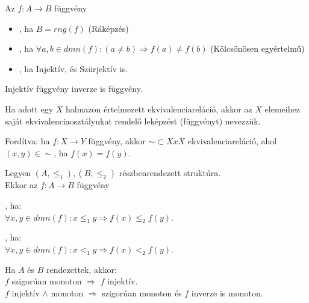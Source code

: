 \begin{frame}
\begin{tcolorbox}[title={Def.: Függvények típusai}]
Az $f: A \rightarrow B$ függvény\\
\begin{itemize}
\item {}, ha $B = rng(f)$ (Ráképzés)
\item {}, ha ${\forall} a, b \in dmn(f) : (a \neq b) \Rightarrow f(a) \neq f(b)$ (Kölcsönösen egyértelmű)
\item {}, ha Injektív, és Szürjektív is.
\end{itemize}
\end{tcolorbox}

\begin{tcolorbox}[title={Ész}]
Injektív függvény inverze is függvény.
\end{tcolorbox}

\begin{tcolorbox}[title={Def.: Kanonikus leképzés}]
Ha adott egy $X$ halmazon értelmezett ekvivalenciareláció, akkor az $X$ elemeihez saját ekvivalenciaosztályukat rendelő leképzést (függvényt)  nevezzük.\\
\msmallskip

Fordítva: ha $f: X \rightarrow Y$ függvény, akkor $\sim \subset X x X$ ekvivalenciareláció, ahol $(x, y) \in {\sim}$, ha $f(x) = f(y)$.
\end{tcolorbox}
\end{frame}

\begin{frame}
\begin{tcolorbox}[title={Def.: Monoton, Szigorúan monoton függvények}]
Legyen $(A, {\leq}_1), (B, {\leq}_2)$ részbenrendezett struktúra.\\
Ekkor az $f : A \rightarrow B$ függvény\\
\mmedskip

, ha:\\
${\forall}x, y \in dmn(f) : x {\leq}_1 y \Rightarrow f(x) {\leq}_2 f(y)$.\\
\mmedskip

, ha:\\
${\forall}x, y \in dmn(f) : x <_1 y \Rightarrow f(x) <_2 f(y)$.\\
\mmedskip

\end{tcolorbox}

\begin{tcolorbox}[title={Ész}]
Ha $A$ és $B$ rendezettek, akkor:\\
$f$ szigorúan monoton $\Rightarrow$ $f$ injektív.\\
$f$ injektív $\land$ monoton $\Rightarrow$ szigorúan monoton és $f$ inverze is monoton.
\end{tcolorbox}
\end{frame}


